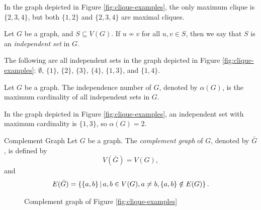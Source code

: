\begin{exmp}
    In the graph depicted in Figure \ref{fig:clique-examples}, the only maximum clique is $\{2, 3, 4\}$, but both $\{1, 2\}$ and $\{2, 3, 4\}$ are maximal cliques.
\end{exmp}

\begin{defn}
    Let $G$ be a graph, and $S \subseteq V(G)$. If $u \not\sim v$ for all $u, v \in S$, then we say that $S$ is an \emph{independent set} in $G$.
\end{defn}

\begin{exmp}
    The following are all independent sets in the graph depicted in Figure \ref{fig:clique-examples}: $\emptyset$, $\{1\}$, $\{2\}$, $\{3\}$, $\{4\}$, $\{1, 3\}$, and $\{1, 4\}$.
\end{exmp}

\begin{defn}
    Let $G$ be a graph. The independence number of $G$, denoted by $\alpha(G)$, is the maximum cardinality of all independent sets in $G$.
\end{defn}

\begin{exmp}
    In the graph depicted in Figure \ref{fig:clique-examples}, an independent set with maximum cardinality is $\{1, 3\}$, so $\alpha(G) = 2$.
\end{exmp}

\begin{defn}Complement Graph\proofbreak
    Let $G$ be a graph. The \emph{complement graph} of $G$, denoted by $\bar{G}$, is defined by
    \[V(\bar{G}) = V(G),\] and
    \[E(\bar{G}) = \left\{\{a, b\} \,\middle|\, a, b \in V(G), a \neq b, \{a, b\} \notin E(G) \right\}.\]
\end{defn}

\begin{figure}[ht!]
    \centering
\caption{Complement graph of Figure \ref{fig:clique-examples}}
\label{fig:complement-example}
\end{figure}

